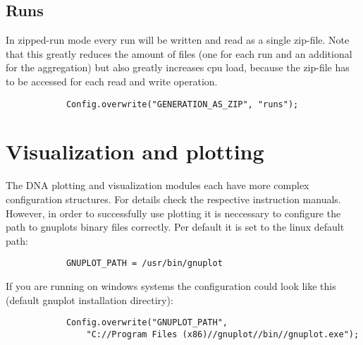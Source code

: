 \subsection{Runs}
In zipped-run mode every run will be written and read as a single zip-file. Note that this greatly reduces the amount of files (one for each run and an additional for the aggregation) but also greatly increases cpu load, because the zip-file has to be accessed for each read and write operation.
\begin{lstlisting}
			Config.overwrite("GENERATION_AS_ZIP", "runs");
\end{lstlisting}

\section{Visualization and plotting}
The DNA plotting and visualization modules each have more complex configuration structures. For details check the respective instruction manuals. However, in order to successfully use plotting it is neccessary to configure the path to gnuplots binary files correctly. Per default it is set to the linux default path:
\begin{lstlisting}
			GNUPLOT_PATH = /usr/bin/gnuplot
\end{lstlisting}
If you are running on windows systems the configuration could look like this (default gnuplot installation directiry):
\begin{lstlisting}
			Config.overwrite("GNUPLOT_PATH",
				"C://Program Files (x86)//gnuplot//bin//gnuplot.exe");	
\end{lstlisting}
